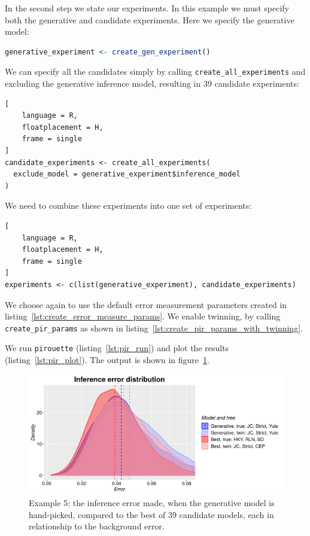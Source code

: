 \documentclass{article}
\begin{document}
In the second step we state our experiments. 
In this example we must specify both the generative and candidate experiments. 
Here we specify the generative model:

\begin{lstlisting}[language=R, floatplacement=H, frame=single]
generative_experiment <- create_gen_experiment()
\end{lstlisting}

We can specify all the candidates simply by calling 
\verb;create_all_experiments; and excluding the generative inference model,
resulting in 39 candidate experiments:

\begin{lstlisting}[
    language = R,
    floatplacement = H,
    frame = single
]
candidate_experiments <- create_all_experiments(
  exclude_model = generative_experiment$inference_model
)
\end{lstlisting}

We need to combine these experiments into one set of experiments:

\begin{lstlisting}[
    language = R,
    floatplacement = H,
    frame = single
]
experiments <- c(list(generative_experiment), candidate_experiments)
\end{lstlisting}

We choose again to use the default error measurement parameters
created in listing~\ref{lst:create_error_measure_params}.
We enable twinning, by calling \verb;create_pir_params;
as shown in listing~\ref{lst:create_pir_params_with_twinning}.

We run \verb;pirouette; (listing~\ref{lst:pir_run}) 
and plot the results (listing~\ref{lst:pir_plot}).
The output is shown in figure~\ref{fig:example_5}.

\begin{figure}[H]
  \includegraphics[width=\textwidth]{example_5/errors.png}
  \caption{
    Example 5: the inference error made, 
    when the generative model is hand-picked, 
    compared to the best of 39 candidate models, 
    each in relationship to the background error.
  }
  \label{fig:example_5}
\end{figure}
\end{document}

